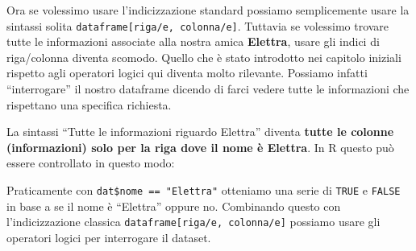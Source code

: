 \documentclass[
]{book}
\newenvironment{Shaded}{\begin{snugshade}}{\end{snugshade}}
\newcommand{\CommentTok}[1]{\textcolor[rgb]{0.56,0.35,0.01}{\textit{#1}}}
\newcommand{\KeywordTok}[1]{\textcolor[rgb]{0.13,0.29,0.53}{\textbf{#1}}}
\newcommand{\NormalTok}[1]{#1}
\newcommand{\OperatorTok}[1]{\textcolor[rgb]{0.81,0.36,0.00}{\textbf{#1}}}
\newcommand{\StringTok}[1]{\textcolor[rgb]{0.31,0.60,0.02}{#1}}
\begin{document}
Ora se volessimo usare l'indicizzazione standard possiamo semplicemente usare la sintassi solita \texttt{dataframe{[}riga/e,\ colonna/e{]}}. Tuttavia se volessimo trovare tutte le informazioni associate alla nostra amica \textbf{Elettra}, usare gli indici di riga/colonna diventa scomodo. Quello che è stato introdotto nei capitolo iniziali rispetto agli operatori logici qui diventa molto rilevante. Possiamo infatti ``interrogare'' il nostro dataframe dicendo di farci vedere tutte le informazioni che rispettano una specifica richiesta.

La sintassi ``Tutte le informazioni riguardo Elettra'' diventa \textbf{tutte le colonne (informazioni) solo per la riga dove il nome è Elettra}. In R questo può essere controllato in questo modo:

\begin{Shaded}
\end{Shaded}

\begin{Shaded}
\end{Shaded}

Praticamente con \texttt{dat\$nome\ ==\ "Elettra"} otteniamo una serie di \texttt{TRUE} e \texttt{FALSE} in base a se il nome è ``Elettra'' oppure no. Combinando questo con l'indicizzazione classica \texttt{dataframe{[}riga/e,\ colonna/e{]}} possiamo usare gli operatori logici per interrogare il dataset.

\begin{Shaded}
\end{Shaded}
\end{document}
